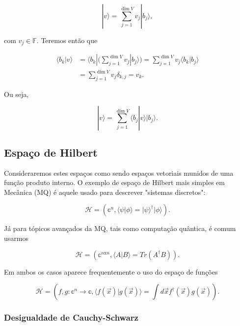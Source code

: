 \documentclass[11pt]{article}
\begin{document}
\begin{equation}
|v\rangle = \sum_{j=1}^{\dim V}v_{j}|b_{j}\rangle,
\end{equation}

com \(v_{j}\in\mathbb{F}\). Teremos então que

\begin{align}
\langle b_{k}|v\rangle & = \langle b_{k}|(\sum_{j=1}^{\dim V}v_{j}|b_{j}\rangle) = \sum_{j=1}^{\dim V}v_{j}\langle b_{k}|b_{j}\rangle \\
& = \sum_{j=1}^{\dim V}v_{j}\delta_{k,j} = v_{k}.
\end{align}

Ou seja,

\begin{equation}
|v\rangle = \sum_{j=1}^{\dim V}\langle b_{j}|v\rangle|b_{j}\rangle.
\end{equation}

    \subsection{Espaço de Hilbert}\label{espauxe7o-de-hilbert}

Consideraremos estes espaços como sendo espaços vetoriais munidos de uma
função produto interno. O exemplo de espaço de Hilbert mais simples em
Mecânica (MQ) é aquele usado para descrever "sistemas discretos":

\begin{equation}
\mathcal{H}=\left(\mathbb{c}^{n},\langle\psi|\phi\rangle=|\psi\rangle^{\dagger}|\phi\rangle\right).
\end{equation}

Já para tópicos avançados da MQ, tais como computação quântica, é comum
usarmos

\begin{equation}
\mathcal{H}=\left(\mathbb{c}^{n\text{x}n},\langle A|B\rangle=Tr(A^{\dagger}B)\right).
\end{equation}

Em ambos os casos aparece frequentemente o uso do espaço de funções

\begin{equation}
\mathcal{H}=\left(f,g:\mathbb{c}^{n}\rightarrow\mathbb{c},\langle f(\vec{x})|g(\vec{x})\rangle=\int d\vec{x}f^{\dagger}(\vec{x})g(\vec{x})\right).
\end{equation}

    \subsubsection{Desigualdade de
Cauchy-Schwarz}\label{desigualdade-de-cauchy-schwarz}
\end{document}
